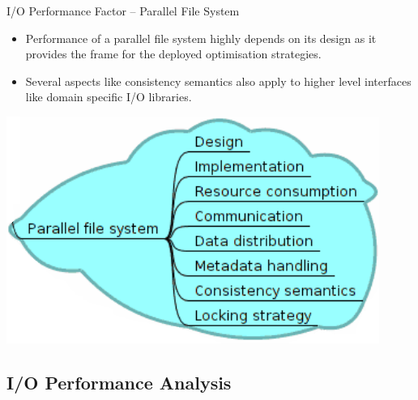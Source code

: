 \documentclass[compress,11pt,xcolor=svgnames,aspectratio=169]{beamer}
\begin{document}
\begin{frame}[fragile]{I/O Performance Factor -- Parallel File System}

\begin{itemize}
\setlength\itemsep{0.5cm}

  \item Performance of a parallel file system highly depends on its design as it provides the frame for the deployed optimisation strategies.

  \item Several aspects like consistency semantics also apply to higher level interfaces like domain specific I/O libraries.

\end{itemize}

\begin{center}
\includegraphics[scale=0.5]{fig/tree-io-pfs}
\end{center}

\nocite{SOPPOAASLK13}

\end{frame}

\subsection{I/O Performance Analysis}
\end{document}
